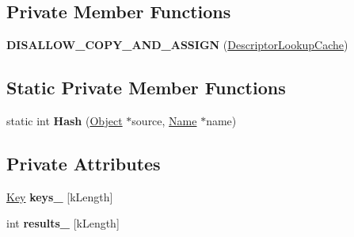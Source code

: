 \subsection*{Private Member Functions}
\begin{DoxyCompactItemize}
\item 
{\bfseries D\+I\+S\+A\+L\+L\+O\+W\+\_\+\+C\+O\+P\+Y\+\_\+\+A\+N\+D\+\_\+\+A\+S\+S\+I\+GN} (\hyperlink{classv8_1_1internal_1_1_descriptor_lookup_cache}{Descriptor\+Lookup\+Cache})\hypertarget{classv8_1_1internal_1_1_descriptor_lookup_cache_a6037810be96fb498734133bcc38c22e7}{}\label{classv8_1_1internal_1_1_descriptor_lookup_cache_a6037810be96fb498734133bcc38c22e7}

\end{DoxyCompactItemize}
\subsection*{Static Private Member Functions}
\begin{DoxyCompactItemize}
\item 
static int {\bfseries Hash} (\hyperlink{classv8_1_1internal_1_1_object}{Object} $\ast$source, \hyperlink{classv8_1_1internal_1_1_name}{Name} $\ast$name)\hypertarget{classv8_1_1internal_1_1_descriptor_lookup_cache_adfcbfddd52f4267957cdabad0518a6d9}{}\label{classv8_1_1internal_1_1_descriptor_lookup_cache_adfcbfddd52f4267957cdabad0518a6d9}

\end{DoxyCompactItemize}
\subsection*{Private Attributes}
\begin{DoxyCompactItemize}
\item 
\hyperlink{structv8_1_1internal_1_1_descriptor_lookup_cache_1_1_key}{Key} {\bfseries keys\+\_\+} \mbox{[}k\+Length\mbox{]}\hypertarget{classv8_1_1internal_1_1_descriptor_lookup_cache_a1b22f9a0095170bf50d3f66fe2abf5a8}{}\label{classv8_1_1internal_1_1_descriptor_lookup_cache_a1b22f9a0095170bf50d3f66fe2abf5a8}

\item 
int {\bfseries results\+\_\+} \mbox{[}k\+Length\mbox{]}\hypertarget{classv8_1_1internal_1_1_descriptor_lookup_cache_a8647e20c0451797094fee4558764fa65}{}\label{classv8_1_1internal_1_1_descriptor_lookup_cache_a8647e20c0451797094fee4558764fa65}

\end{DoxyCompactItemize}
